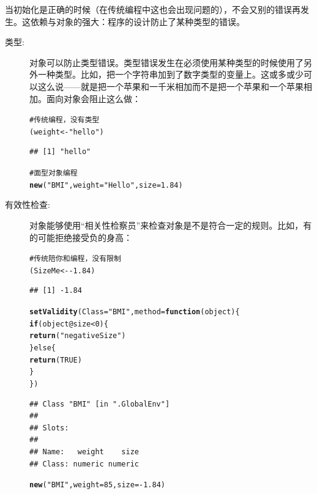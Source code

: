 \documentclass[12pt,a4paper]{article}\usepackage{graphicx, color}
\makeatletter
\newcommand{\hlfunctioncall}[1]{\textcolor[rgb]{0.501960784313725,0,0.329411764705882}{\textbf{#1}}}%
\newcommand{\hlstring}[1]{\textcolor[rgb]{0.6,0.6,1}{#1}}%
\newcommand{\hlcomment}[1]{\textcolor[rgb]{0.180392156862745,0.6,0.341176470588235}{#1}}%
\newenvironment{kframe}{%
 \def\at@end@of@kframe{}%
 \ifinner\ifhmode%
  \def\at@end@of@kframe{\end{minipage}}%
  \begin{minipage}{\columnwidth}%
 \fi\fi%
 \def\FrameCommand##1{\hskip\@totalleftmargin \hskip-\fboxsep
 \colorbox{shadecolor}{##1}\hskip-\fboxsep
     \hskip-\linewidth \hskip-\@totalleftmargin \hskip\columnwidth}%
 \MakeFramed {\advance\hsize-\width
   \@totalleftmargin\z@ \linewidth\hsize
   \@setminipage}}%
 {\par\unskip\endMakeFramed%
 \at@end@of@kframe}
\newenvironment{knitrout}{}{} %
\makeatother
\begin{document}
当初始化是正确的时候（在传统编程中这也会出现问题的），不会又别的错误再发生。这依赖与对象的强大：程序的设计防止了某种类型的错误。
\begin{description}
  \item[类型:]对象可以防止类型错误。类型错误发生在必须使用某种类型的时候使用了另外一种类型。比如，把一个字符串加到了数字类型的变量上。这或多或少可以这么说——就是把一个苹果和一千米相加而不是把一个苹果和一个苹果相加。面向对象会阻止这么做：
\begin{knitrout}
\color{fgcolor}\begin{kframe}
\begin{alltt}
\hlcomment{# 传统编程，没有类型}
(weight <- \hlstring{"hello"})
\end{alltt}
\begin{verbatim}
## [1] "hello"
\end{verbatim}
\begin{alltt}
\hlcomment{# 面型对象编程}
\hlfunctioncall{new}(\hlstring{"BMI"}, weight = \hlstring{"Hello"}, size = 1.84)
\end{alltt}


{\ttfamily\noindent\bfseries\color{errorcolor}{\#\# Error: invalid class "BMI" object: invalid object for slot "weight" in class "BMI": got class "character", should be or extend class "numeric"}}\end{kframe}
\end{knitrout}


  \item[有效性检查:]对象能够使用“相关性检察员”来检查对象是不是符合一定的规则。比如，有的可能拒绝接受负的身高：
\begin{knitrout}
\color{fgcolor}\begin{kframe}
\begin{alltt}
\hlcomment{# 传统陪你和编程，没有限制}
(SizeMe <- -1.84)
\end{alltt}
\begin{verbatim}
## [1] -1.84
\end{verbatim}
\begin{alltt}
\hlfunctioncall{setValidity}(Class = \hlstring{"BMI"}, method = \hlfunctioncall{function}(object) \{
    \hlfunctioncall{if} (object@size < 0) \{
        \hlfunctioncall{return}(\hlstring{"negative Size"})
    \} else \{
        \hlfunctioncall{return}(TRUE)
    \}
\})
\end{alltt}
\begin{verbatim}
## Class "BMI" [in ".GlobalEnv"]
## 
## Slots:
##                       
## Name:   weight    size
## Class: numeric numeric
\end{verbatim}
\begin{alltt}
\hlfunctioncall{new}(\hlstring{"BMI"}, weight = 85, size = -1.84)
\end{alltt}



\end{kframe}
\end{knitrout}
\end{description}
\end{document}
